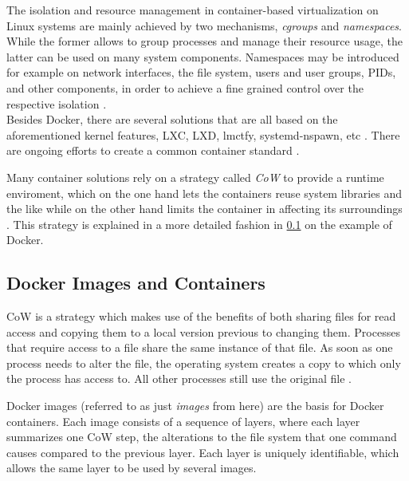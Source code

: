      The isolation and resource management in container-based virtualization on Linux systems are mainly achieved by two mechanisms, \emph{\ac{cgroups}} and \emph{namespaces}. While the former allows to group processes and manage their resource usage, the latter can be used on many system components. Namespaces may be introduced for example on network interfaces, the file system, users and user groups, \acp{PID}, and other components, in order to achieve a fine grained control over the respective isolation \cite{Ruiz2015Performance}. \\
      Besides Docker, there are several solutions that are all based on the aforementioned kernel features, \eg LXC, LXD, lmctfy, systemd-nspawn, etc \cite{Ruiz2015Performance}. There are ongoing efforts to create a common container standard \cite{Initiative????Open}.

      Many container solutions rely on a strategy called \emph{\ac{CoW}} to provide a runtime enviroment, which on the one hand lets the containers reuse system libraries and the like while on the other hand limits the container in affecting its surroundings \cite{Docker????Dockera,Pahl2015Containerization}. This strategy is explained in a more detailed fashion in \ref{sub:docker_images_and_containers} on the example of Docker.


  \subsection{Docker Images and Containers} %
  \label{sub:docker_images_and_containers}
    \ac{CoW} is a strategy which makes use of the benefits of both sharing files for read access and copying them to a local version previous to changing them. Processes that require access to a file share the same instance of that file. As soon as one process needs to alter the file, the operating system creates a copy to which only the process has access to. All other processes still use the original file \cite{Pahl2015Containerization,Docker????Dockera}.

    Docker images (referred to as just \emph{images} from here) are the basis for Docker containers. Each image consists of a sequence of layers, where each layer summarizes one \ac{CoW} step, \ie the alterations to the file system that one command causes compared to the previous layer. Each layer is uniquely identifiable, which allows the same layer to be used by several images.

